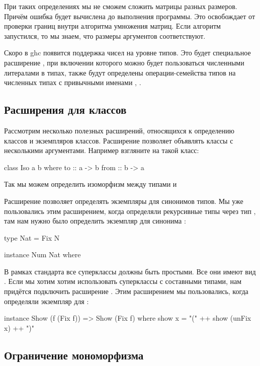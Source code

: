 При таких определениях мы не сможем сложить матрицы
разных размеров. Причём ошибка будет вычислена до 
выполнения программы. Это освобождает от проверки границ
внутри алгоритма умножения матриц. Если алгоритм запустился, то
мы знаем, что размеры аргументов соответствуют.

Скоро в ghc появится поддержка чисел на уровне типов.
Это будет специальное расширение ,
при включении которого можно будет пользоваться численными
литералами в типах, также будут определены 
операции-семейства типов на численных типах
с привычными именами \In{+}, \In{*}. 

\subsection{Расширения для классов}

Рассмотрим несколько полезных расширений, относящихся
к определению классов и экземпляров классов. 
Расширение  позволяет
объявлять классы с несколькими аргументами. Например
взгляните на такой класс:

\begin{code}
class Iso a b where
    to      :: a -> b
    from    :: b -> a
\end{code}

Так мы можем определить изоморфизм между типами  и 

Расширение 
позволяет определять экземпляры для синонимов типов.
Мы уже пользовались этим расширением, когда определяли 
рекурсивные типы через тип , там нам нужно было
определить экземпляр  для синонима :

\begin{code}
type Nat = Fix N

instance Num Nat where
\end{code}

В рамках стандарта все суперклассы должны быть простыми.
Все они имеют вид . Если мы хотим хотим использовать
суперклассы с составными типами, нам придётся подключить
расширение . Этим расширением мы пользовались,
когда определяли экземпляр  для :

\begin{code}
instance Show (f (Fix f)) => Show (Fix f) where
    show x = "(" ++ show (unFix x) ++ ")"
\end{code}


\subsection{Ограничение мономорфизма}


